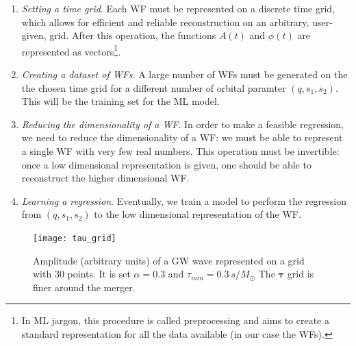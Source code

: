 \begin{enumerate}[label=(\Alph*)]
	\item \textit{Setting a time grid}. Each WF must be represented on a discrete time grid, which allows for efficient and reliable reconstruction on an arbitrary, user-given, grid. After this operation, the functions $A(t)$ and $\phi(t)$ are represented as vectors\footnote{
In ML jargon, this procedure is called preprocessing and aims to create a standard representation for all the data available (in our case the WFs).
}.
	\item \textit{Creating a dataset of WFs}. A large number of WFs must be generated on the the chosen time grid for a different number of orbital paramter $(q,s_1,s_2)$. This will be the training set for the ML model.
	\item \textit{Reducing the dimensionality of a WF}. In order to make a feasible regression, we need to reduce the dimensionality of a WF: we must be able to represent a single WF with very few real numbers. This operation must be invertible: once a low dimensional representation is given, one should be able to reconstruct the higher dimensional WF.
	\item \textit{Learning a regression}. Eventually, we train a model to perform the regression from $(q, s_1, s_2)$ to the low dimensional representation of the WF.
\end{enumerate}


\begin{figure}[!t]
	\centering
	\texttt{[image: tau\_grid]}
	\caption{Amplitude (arbitrary units) of a GW wave represented on a grid with 30 points.
It is set $\alpha = 0.3$ and $\tau_{min} = \SI{0.3}{s/M_\odot}$
The $\boldsymbol{\tau}$ grid is finer around the merger.
}
	\label{fig:tau_grid}
\end{figure}
%
